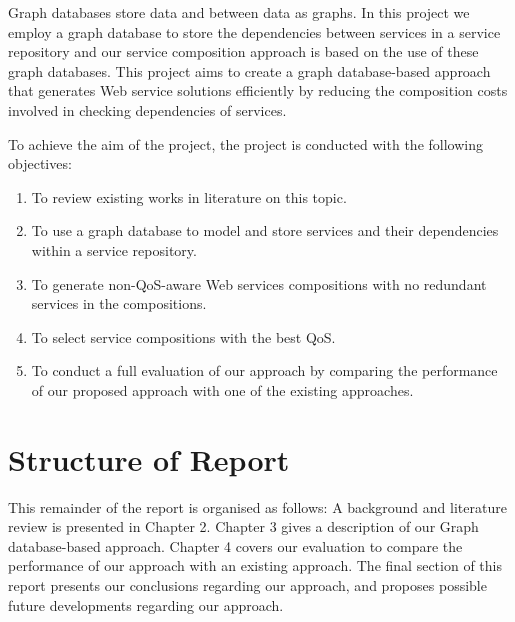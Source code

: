 Graph databases store data and  \cite{6} between data as graphs. In this project we employ a graph database to store the dependencies between services in a service repository and our service composition approach is based on the use of these graph databases. This project aims to create a graph database-based approach that generates Web service solutions efficiently by reducing the composition costs involved in checking dependencies of services. 

To achieve the aim of the project, the project is conducted with the following objectives:
\begin{enumerate}
  \item To review existing works in literature on this topic.
  \item To use a graph database to model and store services and their dependencies within a service repository.
  \item To generate non-QoS-aware Web services compositions with no redundant services in the compositions.
  \item To select service compositions with the best QoS. 
  \item To conduct a full evaluation of our approach by comparing the performance of our proposed approach with one of the existing approaches.
\end{enumerate}



\section{Structure of Report} 
This remainder of the report is organised as follows: A background and literature review is presented in Chapter 2. Chapter 3 gives a description of our Graph database-based approach. Chapter 4 covers our evaluation to compare the performance of our approach with an existing approach.  The final section of this report presents our conclusions regarding our approach, and proposes possible future developments regarding our approach.


